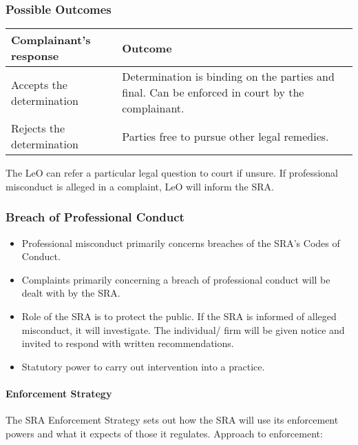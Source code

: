 \documentclass[
]{article}
\providecommand{\tightlist}{%
  \setlength{\itemsep}{0pt}\setlength{\parskip}{0pt}}
\begin{document}
\hypertarget{possible-outcomes}{%
\subsubsection{Possible Outcomes}\label{possible-outcomes}}

\begin{longtable}[]{@{}ll@{}}
\toprule()
Complainant's response & Outcome \\
\midrule()
\endhead
Accepts the determination & Determination is binding on the parties and
final. Can be enforced in court by the complainant. \\
Rejects the determination & Parties free to pursue other legal
remedies. \\
\bottomrule()
\end{longtable}

The LeO can refer a particular legal question to court if unsure. If
professional misconduct is alleged in a complaint, LeO will inform the
SRA.

\hypertarget{breach-of-professional-conduct}{%
\subsubsection{Breach of Professional
Conduct}\label{breach-of-professional-conduct}}

\begin{itemize}
\tightlist
\item
  Professional misconduct primarily concerns breaches of the SRA's Codes
  of Conduct.
\item
  Complaints primarily concerning a breach of professional conduct will
  be dealt with by the SRA.
\item
  Role of the SRA is to protect the public. If the SRA is informed of
  alleged misconduct, it will investigate. The individual/ firm will be
  given notice and invited to respond with written recommendations.
\item
  Statutory power to carry out intervention into a practice.
\end{itemize}

\hypertarget{enforcement-strategy}{%
\paragraph{Enforcement Strategy}\label{enforcement-strategy}}

The SRA Enforcement Strategy sets out how the SRA will use its
enforcement powers and what it expects of those it regulates. Approach
to enforcement:
\end{document}
